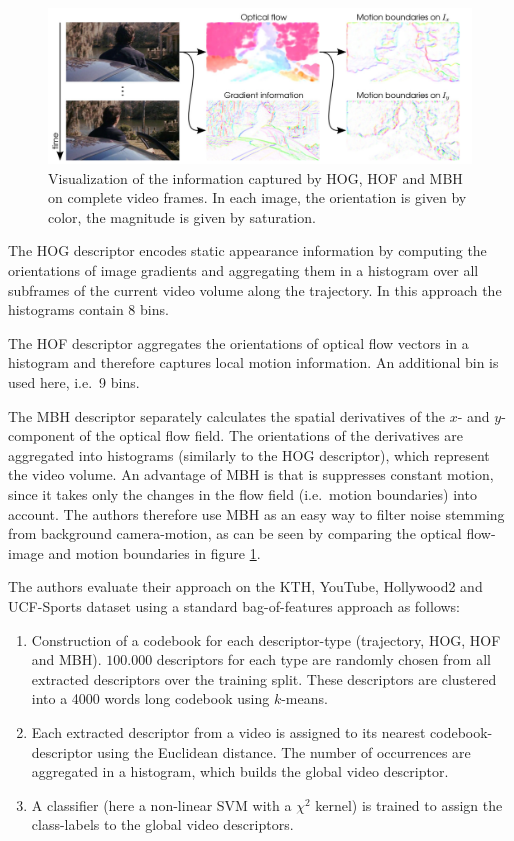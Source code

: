 \begin{figure}[H]
    \centering
    \includegraphics[width=\textwidth]{img_conventional/densetrajectories_featurevisualization}
    \caption{Visualization of the information captured by HOG, HOF and MBH on complete video frames. In each image, the orientation is given by color, the magnitude is given by saturation. \cite{wang_action_2011}}
    \label{fig:densetrajectories_featurevisualization}
\end{figure}

The HOG descriptor encodes static appearance information by computing the orientations of image gradients and aggregating them in a histogram over all subframes of the current video volume along the trajectory. In this approach the histograms contain 8 bins.

The HOF descriptor aggregates the orientations of optical flow vectors in a histogram and therefore captures local motion information. An additional bin is used here, i.e.\ 9 bins.

The MBH descriptor separately calculates the spatial derivatives of the $x$- and $y$-component of the optical flow field.
The orientations of the derivatives are aggregated into histograms (similarly to the HOG descriptor), which represent the video volume.
An advantage of MBH is that is suppresses constant motion, since it takes only the changes in the flow field (i.e.\ motion boundaries) into account.
The authors therefore use MBH as an easy way to filter noise stemming from background camera-motion, as can be seen by comparing the optical flow-image and motion boundaries in figure \ref{fig:densetrajectories_featurevisualization}.

The authors evaluate their approach on the KTH, YouTube, Hollywood2 and UCF-Sports dataset using a standard bag-of-features approach as follows:

\begin{enumerate}
    \item Construction of a codebook for each descriptor-type (trajectory, HOG, HOF and MBH).
        $100.000$ descriptors for each type are randomly chosen from all extracted descriptors over the training split.
        These descriptors are clustered into a 4000 words long codebook using $k$-means.
    \item Each extracted descriptor from a video is assigned to its nearest codebook-descriptor using the Euclidean distance.
        The number of occurrences are aggregated in a histogram, which builds the global video descriptor.
    \item A classifier (here a non-linear SVM with a $\chi^2$ kernel) is trained to assign the class-labels to the global video descriptors.
\end{enumerate}

